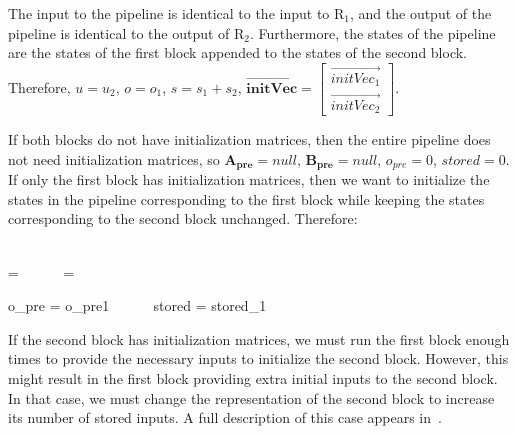The input to the pipeline is identical to the input to $\mathrm{R_1}$,
and the output of the pipeline is identical to the output of
$\mathrm{R_2}$. Furthermore, the states of the pipeline are the states
of the first block appended to the states of the second
block. Therefore, $u = u_2$, $o = o_1$, $s = s_1 + s_2$,
$\overrightarrow{\mathbf{initVec}} = \left [ \begin{array} {c}
\overrightarrow{initVec_1} \\ \overrightarrow{initVec_2}
\end{array} \right ]$.

If both blocks do not have initialization matrices, then the entire
pipeline does not need initialization matrices, so $\mathbf{A_{pre}} =
null$, $\mathbf{B_{pre}} = null$, $o_{pre} = 0$, $stored = 0$. If only
the first block has initialization matrices, then we want to
initialize the states in the pipeline corresponding to the first block
while keeping the states corresponding to the second block
unchanged. Therefore:

\begin{minipage}{3.3in}
~ \\ \vspace{-30pt}
\starteqnstar
{} =  ~~~~~
 = 
\doneeqnstar
~ \\ \vspace{-28pt}
\end{minipage}
\begin{minipage}[b]{2in}
\starteqnstar
o_{pre} = o_{pre1} ~~~~~
stored = stored_1
\doneeqnstar
\end{minipage}

If the second block has initialization matrices, we must run the first
block enough times to provide the necessary inputs to initialize the
second block. However, this might result in the first block providing
extra initial inputs to the second block. In that case, we must change
the representation of the second block to increase its number of
stored inputs.  A full description of this case appears
in~\cite{Agrawal04}.

